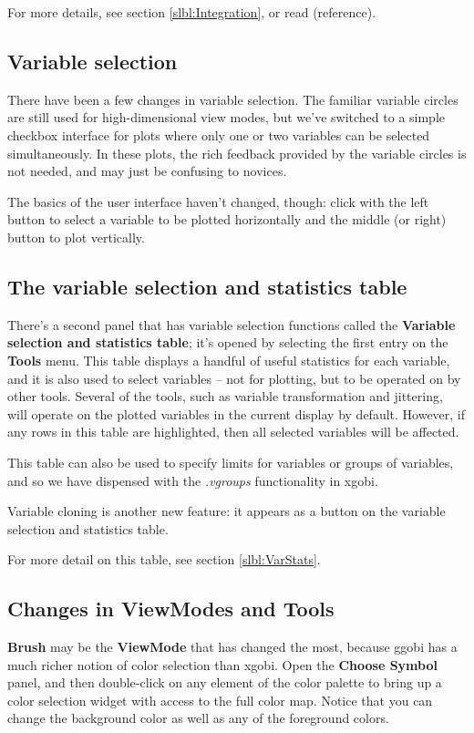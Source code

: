 \documentclass[11pt]{article}
\begin{document}
For more details, see section \ref{slbl:Integration}, or read
(reference).

\subsection {Variable selection}

There have been a few changes in variable selection.  The
familiar variable circles are still used for high-dimensional
view modes, but we've switched to a simple checkbox interface
for plots where only one or two variables can be selected
simultaneously.  In these plots, the rich feedback provided
by the variable circles is not needed, and may just be confusing
to novices.

The basics of the user interface haven't changed, though:
click with the left button to select a variable to be plotted
horizontally and the middle (or right) button to plot vertically.

\subsection {The variable selection and statistics table}

There's a second panel that has variable selection functions called
the {\bf Variable selection and statistics table}; it's opened by
selecting the first entry on the {\bf Tools} menu.  This table
displays a handful of useful statistics for each variable, and it is
also used to select variables -- not for plotting, but to be operated
on by other tools.  Several of the tools, such as variable
transformation and jittering, will operate on the plotted variables
in the current display by default.  However, if any rows in this
table are highlighted, then all selected variables will be affected.

This table can also be used to specify limits for variables or groups
of variables, and so we have dispensed with the {\em .vgroups}
functionality in xgobi.

Variable cloning is another new feature: it appears as a button
on the variable selection and statistics table.

For more detail on this table, see section \ref{slbl:VarStats}.

\subsection{Changes in ViewModes and Tools}

{\bf Brush} may be the {\bf ViewMode} that has changed the most,
because ggobi has a much richer notion of color selection than
xgobi.  Open the {\bf Choose Symbol} panel, and then double-click on
any element of the color palette to bring up a color selection widget
with access to the full color map.  Notice that you can change the
background color as well as any of the foreground colors.
\end{document}
